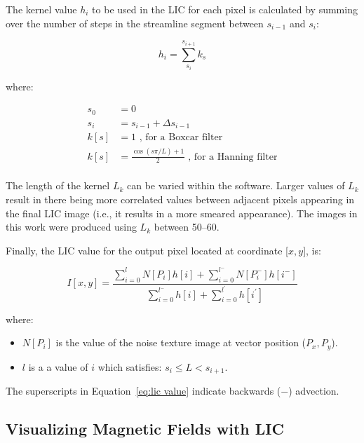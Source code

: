 The kernel value $h_{i}$ to be used in the LIC for each pixel is calculated by summing over the number of steps in the streamline segment between $s_{i - 1}$ and $s_{i}$:

\begin{equation}
  h_{i} = \sum\limits_{s_{i}}^{s_{i + 1}} k_{s}
\end{equation}

where:

\begin{align*}
  s_{0} &= 0 \\
  s_{i} &= s_{i - 1} + \Delta s_{i - 1} \\
  k[s] &= 1 \textrm{  , for a Boxcar filter} \\
  k[s] &= \frac{ \mathrm{\cos}(s\pi/L) + 1}{2} \textrm{  , for a Hanning filter} \\
\end{align*}

The length of the kernel $L_{k}$ can be varied within the software. Larger values of $L_{k}$ result in there being more correlated values between adjacent pixels appearing in the final LIC image (i.e., it results in a more smeared appearance). The images in this work were produced using $L_{k}$ between 50--60.

Finally, the LIC value for the output pixel located at coordinate [$x, y$], is:

\begin{equation}\label{eq:lic value}
  I[x,y] = \frac{  \sum\limits_{i=0}^{l} N[P_{i}]h[i] + \sum\limits_{i=0}^{l^{-}} N[P_{i}^{-}]h[i^{-}]}{ \sum\limits_{i=0}^{l^{-}} h[i] + \sum\limits_{i=0}^{l^{\prime}} h[i^{\prime}] }
\end{equation}

where:
\begin{itemize}[label={},nosep]
  \item $N[P_{i}]$ is the value of the noise texture image at vector position ($P_{x}, P_{y}$).
  \item $l$ is a a value of $i$ which satisfies: $s_{i} \leq L < s_{i + 1}$.
\end{itemize}

The superscripts in Equation~\ref{eq:lic value} indicate backwards ($-$) advection.

\subsection{Visualizing Magnetic Fields with LIC}\label{LIC maps}

